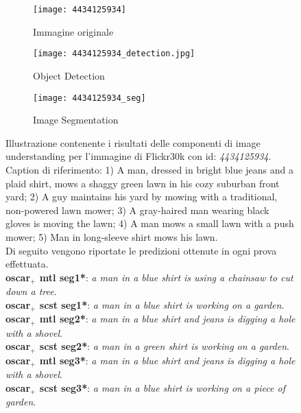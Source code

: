 \begin{figure}[H]
     \centering
     \begin{subfigure}[b]{0.31\textwidth}
         \centering
         \texttt{[image: 4434125934]}
         \caption{Immagine originale}
     \end{subfigure}
     \begin{subfigure}[b]{0.31\textwidth}
         \centering
         \texttt{[image: 4434125934\_detection.jpg]}
         \caption{Object Detection}
     \end{subfigure}
     \begin{subfigure}[b]{0.31\textwidth}
         \centering
         \texttt{[image: 4434125934\_seg]}
         \caption{Image Segmentation}
     \end{subfigure}
     \captionsetup{singlelinecheck=off}
        \caption{Illustrazione contenente i risultati delle componenti di image understanding per l'immagine di Flickr30k con id: \textit{4434125934}.
        Caption di riferimento: 1)  A man, dressed in bright blue jeans and a plaid shirt, mows a shaggy green lawn in his cozy suburban front yard; 2) A guy maintains his yard by mowing with a traditional, non-powered lawn mower; 3) A gray-haired man wearing black gloves is moving the lawn; 4) A man mows a small lawn with a push mower; 5) Man in long-sleeve shirt mows his lawn.\\
        Di seguito vengono riportate le predizioni ottenute in ogni prova effettuata.\\
        \textbf{\acrshort{oscar}$_+$ \acrshort{mtl} seg1*}: \textit{a man in a blue shirt is using a chainsaw to cut down a tree}.\\
        \textbf{\acrshort{oscar}$_+$ \acrshort{scst} seg1*}: \textit{a man in a blue shirt is working on a garden}.\\
        \textbf{\acrshort{oscar}$_+$ \acrshort{mtl} seg2*}: \textit{a man in a blue shirt and jeans is digging a hole with a shovel}.\\
        \textbf{\acrshort{oscar}$_+$ \acrshort{scst} seg2*}: \textit{a man in a green shirt is working on a garden}.\\
        \textbf{\acrshort{oscar}$_+$ \acrshort{mtl} seg3*}: \textit{a man in a blue shirt and jeans is digging a hole with a shovel}.\\
        \textbf{\acrshort{oscar}$_+$ \acrshort{scst} seg3*}: \textit{a man in a blue shirt is working on a piece of garden}.\\
}
\end{figure}
